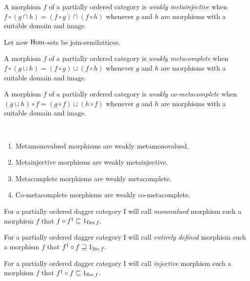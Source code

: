\begin{defn}
A morphism $f$ of a partially
ordered category is \emph{weakly metainjective} when $f\circ(g\sqcap h)=(f\circ g)\sqcap(f\circ h)$
whenever $g$ and $h$ are morphisms with a suitable domain and image.
\end{defn}
Let now $\operatorname{Hom}$-sets be join-semilattices.
\begin{defn}
A morphism $f$ of a partially
ordered category is \emph{weakly metacomplete} when $f\circ(g\sqcup h)=(f\circ g)\sqcup(f\circ h)$
whenever $g$ and $h$ are morphisms with a suitable domain and image.
\end{defn}

\begin{defn}
A morphism $f$ of a partially
ordered category is \emph{weakly co-metacomplete} when $(g\sqcup h)\circ f=(g\circ f)\sqcup(h\circ f)$
whenever $g$ and $h$ are morphisms with a suitable domain and image.\end{defn}
\begin{obvious}
~
\begin{enumerate}
\item Metamonovalued morphisms are weakly metamonovalued.
\item Metainjective morphisms are weakly metainjective.
\item Metacomplete morphisms are weakly metacomplete.
\item Co-metacomplete morphisms are weakly co-metacomplete.
\end{enumerate}
\end{obvious}

\begin{defn}
For a partially ordered dagger category
I will call \emph{monovalued} morphism such a morphism $f$ that $f\circ f^{\dagger}\sqsubseteq1_{\operatorname{Dst} f}$.
\end{defn}

\begin{defn}
For a partially ordered dagger category
I will call \emph{entirely defined} morphism such a morphism $f$
that $f^{\dagger}\circ f\sqsupseteq1_{\operatorname{Src} f}$.
\end{defn}

\begin{defn}
For a partially ordered dagger category
I will call \emph{injective} morphism such a morphism $f$ that $f^{\dagger}\circ f\sqsubseteq1_{\operatorname{Src} f}$.
\end{defn}

